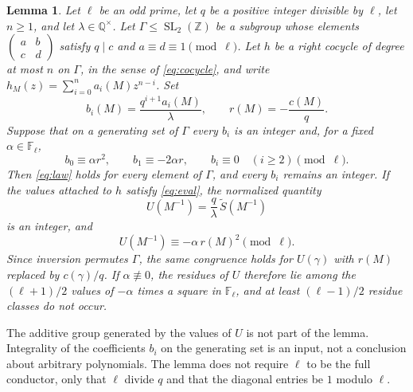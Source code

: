 \documentclass[11pt]{article}
\newtheorem{lemma}[theorem]{Lemma}
\theoremstyle{remark}
\newcommand{\tS}{\widetilde{S}}
\newcommand{\Z}{\mathbb{Z}}
\newcommand{\Q}{\mathbb{Q}}
\newcommand{\SL}{\operatorname{SL}}
\begin{document}
\begin{lemma}
\label{lem:uni}
Let \(\ell\) be an odd prime, let \(q\) be a positive integer divisible by \(\ell\), let \(n\ge 1\), and let \(\lambda\in\Q^\times\).
Let \(\Gamma\le\SL_2(\Z)\) be a subgroup whose elements \(\begin{pmatrix}a&b\\c&d\end{pmatrix}\) satisfy \(q\mid c\) and \(a\equiv d\equiv 1\pmod{\ell}\).
Let \(h\) be a right cocycle of degree at most \(n\) on \(\Gamma\), in the sense of \eqref{eq:cocycle}, and write \(h_M(z)=\sum_{i=0}^{n}a_i(M)z^{n-i}\).
Set
\[
b_i(M)=\frac{q^{i+1}a_i(M)}{\lambda},\qquad r(M)=-\frac{c(M)}{q}.
\]
Suppose that on a generating set of \(\Gamma\) every \(b_i\) is an integer and, for a fixed \(\alpha\in\mathbb{F}_\ell\),
\begin{equation}
\label{eq:law}
b_0\equiv\alpha r^2,\qquad b_1\equiv -2\alpha r,\qquad b_i\equiv 0\quad(i\ge 2)\pmod{\ell}.
\end{equation}
Then \eqref{eq:law} holds for every element of \(\Gamma\), and every \(b_i\) remains an integer.
If the values attached to \(h\) satisfy \eqref{eq:eval}, the normalized quantity
\[
U(M^{-1})=\frac{q}{\lambda}\,\tS(M^{-1})
\]
is an integer, and
\begin{equation}
\label{eq:U}
U(M^{-1})\equiv -\alpha\, r(M)^2\pmod{\ell}.
\end{equation}
Since inversion permutes \(\Gamma\), the same congruence holds for \(U(\gamma)\) with \(r(M)\) replaced by \(c(\gamma)/q\).
If \(\alpha\not\equiv 0\), the residues of \(U\) therefore lie among the \((\ell+1)/2\) values of \(-\alpha\) times a square in \(\mathbb{F}_\ell\), and at least \((\ell-1)/2\) residue classes do not occur.
\end{lemma}

The additive group generated by the values of \(U\) is not part of the lemma.
Integrality of the coefficients \(b_i\) on the generating set is an input, not a conclusion about arbitrary polynomials.
The lemma does not require \(\ell\) to be the full conductor, only that \(\ell\) divide \(q\) and that the diagonal entries be \(1\) modulo \(\ell\).
\end{document}
